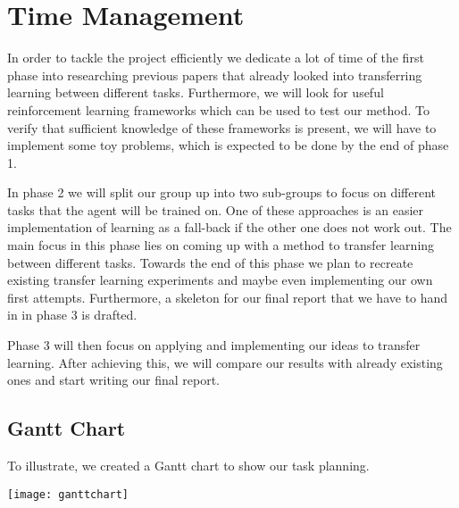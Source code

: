 \section{Time Management}
\label{sec:time}
In order to tackle the project efficiently we dedicate a lot of time of the first phase into researching previous papers that already looked into transferring learning between different tasks. Furthermore, we will look for useful reinforcement learning frameworks which can be used to test our method. To verify that sufficient knowledge of these frameworks is present, we will have to implement some toy problems, which is expected to be done by the end of phase 1. 


In phase 2 we will split our group up into two sub-groups to focus on different tasks that the agent will be trained on. One of these approaches is an easier implementation of learning as a fall-back if the other one does not work out. The main focus in this phase lies on coming up with a method to transfer learning between different tasks. Towards the end of this phase we plan to recreate existing transfer learning experiments and maybe even implementing our own first attempts. Furthermore, a skeleton for our final report that we have to hand in in phase 3 is drafted.


Phase 3 will then focus on applying and implementing our ideas to transfer learning. After achieving this, we will compare our results with already existing ones and start writing our final report.

\subsection{Gantt Chart}
To illustrate, we created a Gantt chart to show our task planning.

\noindent
\texttt{[image: ganttchart]}


